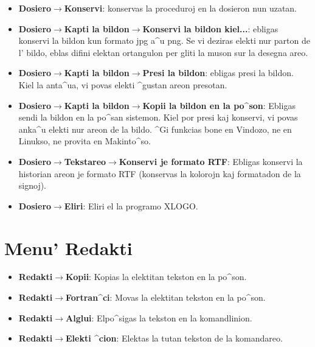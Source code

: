 \begin{itemize}
\begin{center}
\end{center}
\vspace{0.25cm}
\item \textbf{Dosiero$\to$Konservi}: konservas la proceduroj en la
  dosieron nun uzatan.
\item \textbf{Dosiero$\to$Kapti la bildon$\to$Konservi la bildon
    kiel...}: ebligas konservi la bildon kun formato jpg a^u png.  Se
  vi deziras elekti nur parton de l' bildo, eblas difini elektan
  ortangulon per gliti la muson sur la desegna areo.
\item \textbf{Dosiero$\to$Kapti la bildon$\to$Presi la bildon}:
  ebligas presi la bildon.  Kiel la anta^ua, vi povas elekti ^gustan
  areon presotan.
\item \textbf{Dosiero$\to$Kapti la bildon$\to$Kopii la bildon en la
    po^son}: Ebligas sendi la bildon en la po^san sistemon.  Kiel por
  presi kaj konservi, vi povas anka^u elekti nur areon de la bildo.
  ^Gi funkcias bone en Vindozo, ne en Linukso, ne provita en
  Makinto^so.
\item \textbf{Dosiero$\to$Tekstareo$\to$Konservi je formato RTF}:
  Ebligas konservi la historian areon je formato RTF (konservas la
  kolorojn kaj formatadon de la signoj).
\item \textbf{Dosiero$\to$Eliri}: Eliri el la programo XLOGO.
\end{itemize}

\section{Menu' \og Redakti\fg}
\begin{itemize}
\item \textbf{Redakti$\to$Kopii}: Kopias la elektitan tekston en la
  po^son.
\item \textbf{Redakti$\to$Fortran^ci}: Movas la elektitan tekston en
  la po^son.
\item \textbf{Redakti$\to$Alglui}: Elpo^sigas la tekston en la
  komandlinion.
\item \textbf{Redakti$\to$Elekti ^cion}: Elektas la tutan tekston de
  la komandareo.
\end{itemize}

